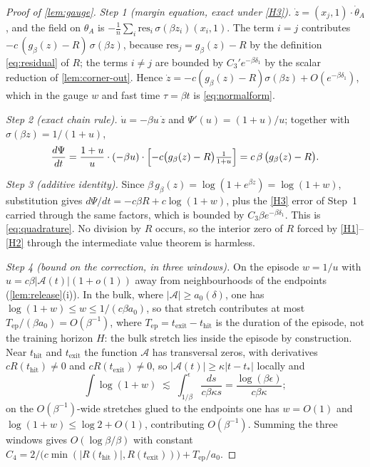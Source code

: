 \documentclass[11pt]{article}
\theoremstyle{definition}
\theoremstyle{remark}
\newcommand{\thit}{t_{\mathrm{hit}}}
\newcommand{\texit}{t_{\mathrm{exit}}}
\newcommand{\Ar}{\mathcal{A}}                      %
\newcommand{\Tep}{T_{\mathrm{ep}}}   %
\begin{document}
\begin{proof}[Proof of \cref{lem:gauge}]
\emph{Step 1 (margin equation, exact under \eqref{H3}).}
$\dot z=(x_j,1)\cdot\dot\theta_A$, and the field on $\theta_A$ is
$-\tfrac1n\sum_i\mathrm{res}_i\,\sigma(\beta z_i)(x_i,1)$. The term $i=j$
contributes $-c\,(g_\beta(z)-R)\,\sigma(\beta z)$, because
$\mathrm{res}_j=g_\beta(z)-R$ by the definition \eqref{eq:residual} of $R$; the
terms $i\ne j$ are bounded by $C_3'e^{-\beta\delta_1}$ by the scalar reduction of
\cref{lem:corner-out}. Hence
$\dot z=-c(g_\beta(z)-R)\sigma(\beta z)+O(e^{-\beta\delta_1})$, which in the
gauge $w$ and fast time $\tau=\beta t$ is \eqref{eq:normalform}.

\emph{Step 2 (exact chain rule).} $\dot u=-\beta u\,\dot z$ and
$\Psi'(u)=(1+u)/u$; together with $\sigma(\beta z)=1/(1+u)$,
\[
\frac{d\Psi}{dt}
=\frac{1+u}{u}\cdot(-\beta u)\cdot
\Bigl[-c\bigl(g_\beta(z)-R\bigr)\tfrac{1}{1+u}\Bigr]
=c\,\beta\,\bigl(g_\beta(z)-R\bigr).
\]

\emph{Step 3 (additive identity).} Since $\beta\,g_\beta(z)=\log(1+e^{\beta z})
=\log(1+w)$, substitution gives $d\Psi/dt=-c\beta R+c\log(1+w)$, plus the
\eqref{H3} error of Step~1 carried through the same factors, which is bounded by
$C_3\beta e^{-\beta\delta_1}$. This is \eqref{eq:quadrature}. No division by $R$
occurs, so the interior zero of $R$ forced by \eqref{H1}--\eqref{H2} through the
intermediate value theorem is harmless.

\emph{Step 4 (bound on the correction, in three windows).} On the episode
$w=1/u$ with $u=c\beta|\Ar(t)|(1+o(1))$ away from neighbourhoods of the endpoints
(\cref{lem:release}(i)). In the bulk, where $|\Ar|\ge a_0(\delta)$, one has
$\log(1+w)\le w\le 1/(c\beta a_0)$, so that stretch contributes at most
$\Tep/(\beta a_0)=O(\beta^{-1})$, where $\Tep=\texit-\thit$ is the duration of the
episode, not the training horizon $H$: the bulk stretch lies inside the episode by
construction. Near $\thit$ and $\texit$ the function $\Ar$ has
transversal zeros, with derivatives $cR(\thit)\ne0$ and $cR(\texit)\ne0$, so
$|\Ar(t)|\ge\kappa|t-t_\ast|$ locally and
\[
\int\log(1+w)\;\lesssim\;\int_{1/\beta}^{\epsilon}\frac{ds}{c\beta\kappa s}
=\frac{\log(\beta\epsilon)}{c\beta\kappa};
\]
on the $O(\beta^{-1})$-wide stretches glued to the endpoints one has $w=O(1)$ and
$\log(1+w)\le\log2+O(1)$, contributing $O(\beta^{-1})$. Summing the three windows
gives $O(\log\beta/\beta)$ with constant
$C_4=2/\bigl(c\min(|R(\thit)|,R(\texit))\bigr)+\Tep/a_0$.
\end{proof}
\end{document}
